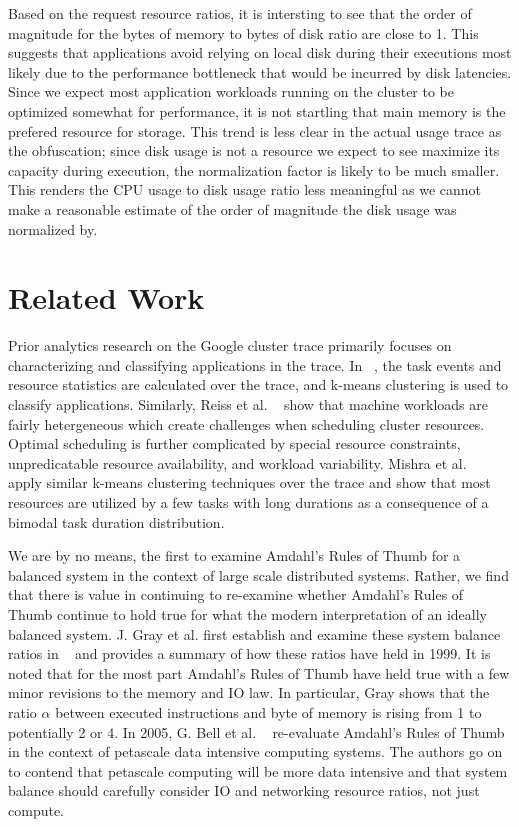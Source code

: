 \documentclass{sig-alternate}
\begin{document}
Based on the request resource ratios, it is intersting to see that the order of magnitude for the bytes of memory to bytes of disk ratio are close to 1.
This suggests that applications avoid relying on local disk during their executions most likely due to the performance bottleneck that would be incurred by disk latencies.
Since we expect most application workloads running on the cluster to be optimized somewhat for performance, it is not startling that main memory is the prefered resource for storage.
This trend is less clear in the actual usage trace as the obfuscation; since disk usage is not a resource we expect to see maximize its capacity during execution, the normalization factor is likely to be much smaller.
This renders the CPU usage to disk usage ratio less meaningful as we cannot make a reasonable estimate of the order of magnitude the disk usage was normalized by.

\section{Related Work}

Prior analytics research on the Google cluster trace primarily focuses on characterizing and classifying applications in the trace.
In ~\cite{clusterdata:Di2013}, the task events and resource statistics are calculated over the trace, and k-means clustering is used to classify applications.
Similarly, Reiss et al. ~\cite{clusterdata:Reiss2012b} show that machine workloads are fairly hetergeneous which create challenges when scheduling cluster resources.
Optimal scheduling is further complicated by special resource constraints, unpredicatable resource availability, and workload variability.
Mishra et al. ~\cite{clusterdata:Mishra2010} apply similar k-means clustering techniques over the trace and show that most resources are utilized by a few tasks with long durations as a consequence of a bimodal task duration distribution.

We are by no means, the first to examine Amdahl's Rules of Thumb for a balanced system in the context of large scale distributed systems.
Rather, we find that there is value in continuing to re-examine whether Amdahl's Rules of Thumb continue to hold true for what the modern interpretation of an ideally balanced system.
J. Gray et al. first establish and examine these system balance ratios in ~\cite{export:68636} and provides a summary of how these ratios have held in 1999.
It is noted that for the most part Amdahl's Rules of Thumb have held true with a few minor revisions to the memory and IO law.
In particular, Gray shows that the ratio $\alpha$ between executed instructions and byte of memory is rising from 1 to potentially 2 or 4.
In 2005, G. Bell et al. ~\cite{Bell:2006:PCS:1110638.1110681} re-evaluate Amdahl's Rules of Thumb in the context of petascale data intensive computing systems.
The authors go on to contend that petascale computing will be more data intensive and that system balance should carefully consider IO and networking resource ratios, not just compute.
\end{document}
